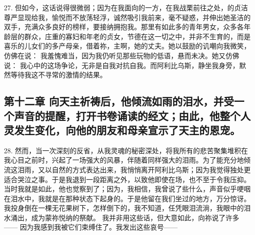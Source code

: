 27. 但如今，这话说得很微弱；因为在我面向的一方，在我战栗前往之处，的贞洁尊严显现给我，愉悦而不放荡轻浮，诚然吸引我前来，毫不疑惑，并伸出她圣洁的双手，充满众多良好的榜样，要接纳拥抱我。那里有如此多的青年男女，众多各年龄层的群众，庄重的寡妇和年老的贞女，节德在这一切之中，并非不生育的，而是喜乐的儿女们的多产母亲，借着祢，主啊，她的丈夫。她以鼓励的讥嘲向我微笑，仿佛在说： 我羞愧难当，因为我仍听见那些玩物的低语，悬而未决。她又仿佛说： 我心中的这场争论，无非是自我对抗自我。而阿利比乌斯，静坐我身旁，默然等待我这不寻常的激情的结果。\par


\subsection{第十二章 向天主祈祷后，他倾流如雨的泪水，并受一个声音的提醒，打开书卷诵读的经文；由此，他整个人灵发生变化，向他的朋友和母亲宣示了天主的恩宠。}

28. 然而，当一次深刻的反省，从我灵魂的秘密深处，将我所有的悲苦聚集堆积在我心目之前时，兴起了一场强大的风暴，伴随着同样强大的泪雨。为了能充分地倾流这泪雨，又以自然的方式表达出来，我悄悄离开阿利比乌斯；因为我觉得独处更适合哭泣之事。于是我退到一段距离之外，以致他即使在场，也不至于令我压抑。当时我就是如此，他也觉察到了；因为，我相信，我曾说了些什么，声音似乎哽咽在泪水中，我就是在那种状态下起身的。于是他留在我们坐过的地方，万分惊讶。我投身倒在一棵无花果树下，怎样倒下的，我不知道，任凭眼泪流淌，我眼中的泪水涌出，成为蒙祢悦纳的祭献。 我并非用这些话，但大意如此，向祢说了许多——  因为我感到我被它们束缚住了。我发出这些哀号——\par

